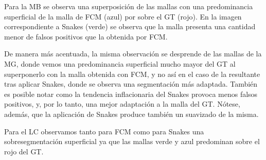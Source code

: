 Para la MB se observa una superposición de las mallas con una predominancia superficial de la malla de FCM (azul) por sobre el GT (rojo). En la imagen correspondiente a Snakes (verde) se observa que la malla presenta una cantidad menor de falsos positivos que la obtenida por FCM.

De manera más acentuada, la misma observación se desprende de las mallas de la MG, donde vemos una predominancia superficial mucho mayor del GT al superponerlo con la malla obtenida con FCM, y no así en el caso de la resultante tras aplicar Snakes, donde se observa una segmentación más adaptada. También es posible notar como la tendencia inflacionaria del Snakes provoca menos falsos positivos, y, por lo tanto, una mejor adaptación a la malla del GT.  Nótese, además, que la aplicación de Snakes produce también un suavizado de la misma.

Para el LC observamos tanto para FCM como para Snakes una sobresegmentación superficial ya que las mallas verde y azul predominan sobre el rojo del GT.